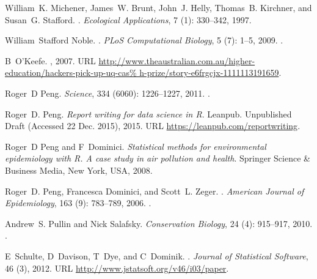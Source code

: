 \documentclass[11pt,a4paper]{article}
\begin{document}
\begin{thebibliography}{30}
William~K. Michener, James~W. Brunt, John~J. Helly, Thomas~B. Kirchner, and
  Susan~G. Stafford.
.
\newblock \emph{Ecological Applications}, 7 (1): 330--342,
  1997.

William~Stafford Noble.
.
\newblock \emph{PLoS Computational Biology}, 5 (7): 1--5,
  2009.
\newblock {}.

B~O'Keefe.
, 2007.
\newblock URL
  \url{http://www.theaustralian.com.au/higher-education/hackers-pick-up-uq-cas%
h-prize/story-e6frgcjx-1111113191659}.

Roger~D Peng.
\newblock \emph{Science}, 334 (6060): 1226--1227, 2011.
\newblock {}.

Roger~D. Peng.
\newblock \emph{{Report writing for data science in R}}.
\newblock Leanpub. Unpublished Draft (Accessed 22 Dec. 2015), 2015.
\newblock URL \url{https://leanpub.com/reportwriting}.

Roger~D Peng and F~Dominici.
\newblock \emph{{Statistical methods for environmental epidemiology with R. A
  case study in air pollution and health}}.
\newblock Springer Science {\&} Business Media, New York, USA, 2008.

Roger~D. Peng, Francesca Dominici, and Scott~L. Zeger.
.
\newblock \emph{American Journal of Epidemiology}, 163 (9):
  783--789, 2006.
\newblock {}.

Andrew~S. Pullin and Nick Salafsky.
\newblock \emph{Conservation Biology}, 24 (4): 915--917,
  2010.
\newblock {}.

E~Schulte, D~Davison, T~Dye, and C~Dominik.
.
\newblock \emph{Journal of Statistical Software}, 46 (3), 2012.
\newblock URL \url{http://www.jstatsoft.org/v46/i03/paper}.


\end{thebibliography}
\end{document}
